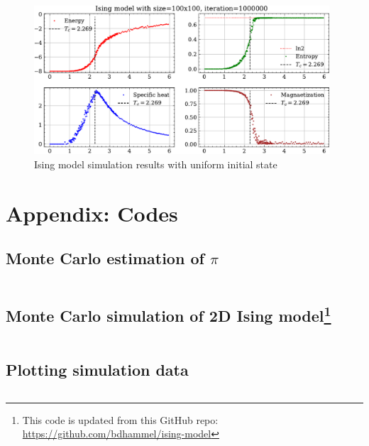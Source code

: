 \documentclass[11pt, a4paper]{article}
\begin{document}
\begin{figure}[!h]
\centering
\includegraphics[width=0.98\textwidth]{fig/ESCM-T-size100-iter1000000.pdf}
\vspace*{-4mm}
\caption{Ising model simulation results with uniform initial state}\label{fig:Results uniform}
\end{figure}

\newpage


\newpage
\appendix
\section{Appendix: Codes}
\subsection{Monte Carlo estimation of $\pi$}
\inputminted[firstline=5,lastline=9]{python}{code/mcpi.py}
\subsection[Monte Carlo simulation of 2D Ising model]{Monte Carlo simulation of 2D Ising model\protect\footnote{This code is updated from this GitHub repo: \url{https://github.com/bdhammel/ising-model}}}
\inputminted[firstline=8,lastline=79]{python}{code/isingTemperature.py}
\subsection{Plotting simulation data}
\inputminted[firstline=6,lastline=24]{python}{code/plotDataFile.py}
\end{document}
